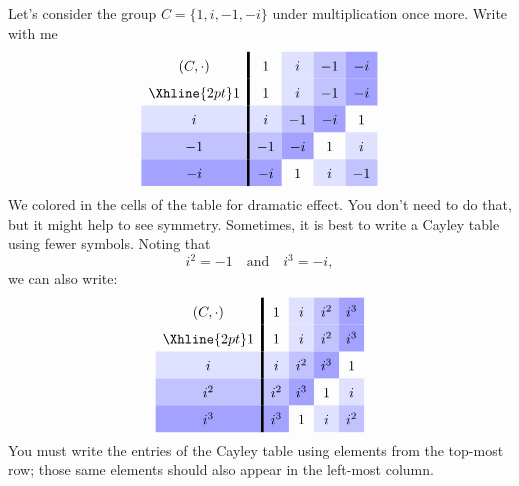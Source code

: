 \documentclass{ximera}
\begin{document}
\begin{example}
  Let's consider the group $C =\{1,i,-1,-i\}$ under multiplication once more.
  Write with me  
  \[
  \renewcommand{\arraystretch}{1.6}
  \begin{array}{c!{\vline width 2pt}cccccc}
    (C,\cdot)& 1     & i\cellcolor{blue!12!white}     & -1\cellcolor{blue!24!white}    & -i\cellcolor{blue!36!white}  \\  \Xhline{2pt}
    1        & 1     & i\cellcolor{blue!12!white}     & -1\cellcolor{blue!24!white}    & -i\cellcolor{blue!36!white}  \\  
    i\cellcolor{blue!12!white}        & i\cellcolor{blue!12!white}     & -1\cellcolor{blue!24!white}    & -i\cellcolor{blue!36!white}    & 1   \\  
    -1\cellcolor{blue!24!white}       & -1\cellcolor{blue!24!white}    & -i\cellcolor{blue!36!white}    & 1     & i\cellcolor{blue!12!white}   \\  
    -i\cellcolor{blue!36!white}       & -i\cellcolor{blue!36!white}    & 1     & i\cellcolor{blue!12!white}     & -1\cellcolor{blue!24!white}  
  \end{array}
  \]
  We colored in the cells of the table for dramatic effect. You don't
  need to do that, but it might help to see symmetry.  Sometimes, it
  is best to write a Cayley table using fewer symbols.  Noting that
  \[
  i^2 = -1 \quad\text{and}\quad i^3 = -i,
  \]
  we can also write:
  \[
  \renewcommand{\arraystretch}{1.6}
  \begin{array}{c!{\vline width 2pt}cccccc}
    (C,\cdot)& 1     & i\cellcolor{blue!12!white}     & i^2\cellcolor{blue!24!white}    & i^3\cellcolor{blue!36!white}  \\  \Xhline{2pt}
    1        & 1     & i\cellcolor{blue!12!white}     & i^2\cellcolor{blue!24!white}    & i^3\cellcolor{blue!36!white}  \\  
    i\cellcolor{blue!12!white}        & i\cellcolor{blue!12!white}     & i^2\cellcolor{blue!24!white}    & i^3\cellcolor{blue!36!white}    & 1   \\  
    i^2\cellcolor{blue!24!white}       & i^2\cellcolor{blue!24!white}    & i^3\cellcolor{blue!36!white}    & 1     & i\cellcolor{blue!12!white}   \\  
    i^3\cellcolor{blue!36!white}       & i^3\cellcolor{blue!36!white}    & 1     & i\cellcolor{blue!12!white}     & i^2\cellcolor{blue!24!white}  
  \end{array}
  \]
  You must write the entries of the Cayley table using elements from
  the top-most row; those same elements should also appear in the
  left-most column.
\end{example}
\end{document}
